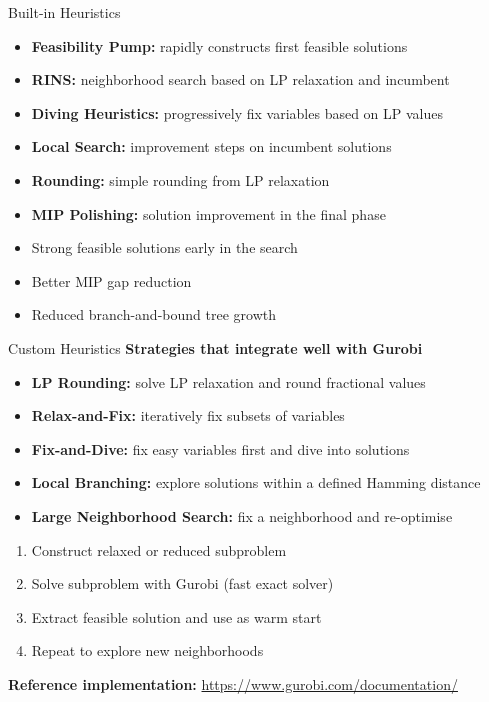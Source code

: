 \documentclass[10pt]{beamer}
\begin{document}
\begin{frame}{Built-in Heuristics}
    \begin{itemize}\Large\textbf{Frequently applied primal heuristics}\normalsize
        \item \textbf{Feasibility Pump:} rapidly constructs first feasible solutions
        \item \textbf{RINS:} neighborhood search based on LP relaxation and incumbent
        \item \textbf{Diving Heuristics:} progressively fix variables based on LP values
        \item \textbf{Local Search:} improvement steps on incumbent solutions
        \item \textbf{Rounding:} simple rounding from LP relaxation
        \item \textbf{MIP Polishing:} solution improvement in the final phase
    \end{itemize}

    \bigskip
    \begin{itemize}\Large\textbf{Benefits}\normalsize
        \item Strong feasible solutions early in the search
        \item Better MIP gap reduction
        \item Reduced branch-and-bound tree growth
    \end{itemize}
\end{frame}

\begin{frame}{Custom Heuristics}
    \Large\textbf{Strategies that integrate well with Gurobi}\normalsize
    \begin{itemize}
        \item \textbf{LP Rounding:} solve LP relaxation and round fractional values
        \item \textbf{Relax-and-Fix:} iteratively fix subsets of variables
        \item \textbf{Fix-and-Dive:} fix easy variables first and dive into solutions
        \item \textbf{Local Branching:} explore solutions within a defined Hamming distance
        \item \textbf{Large Neighborhood Search:} fix a neighborhood and re-optimise
    \end{itemize}

    \bigskip
    \begin{enumerate}\Large\textbf{Workflow}\normalsize
        \item Construct relaxed or reduced subproblem
        \item Solve subproblem with Gurobi (fast exact solver)
        \item Extract feasible solution and use as warm start
        \item Repeat to explore new neighborhoods
    \end{enumerate}

    \bigskip
    \textbf{Reference implementation:} \url{https://www.gurobi.com/documentation/}
\end{frame}
\end{document}
